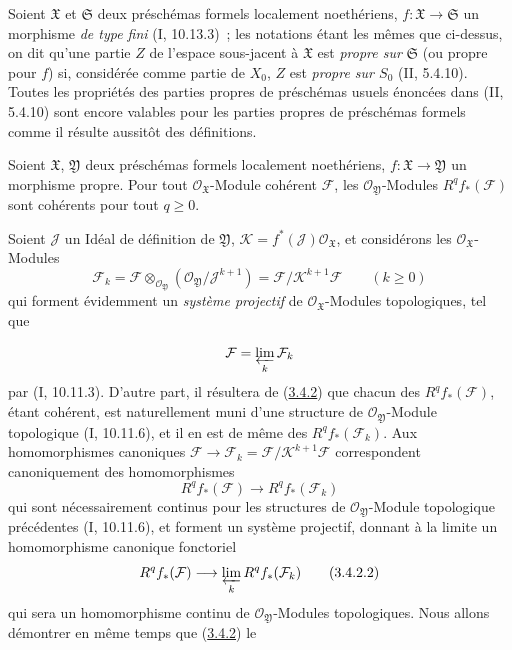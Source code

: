 \begin{env}[3.4.1]
Soient $\mathfrak X$ et $\mathfrak S$ deux préschémas formels localement
noethériens, $f:\mathfrak X\to\mathfrak S$ un morphisme \emph{de type fini}
(I, 10.13.3)~; les notations étant les mêmes que ci-dessus, on dit qu'une
partie $Z$ de l'espace sous-jacent à $\mathfrak X$ est \emph{propre sur}
$\mathfrak S$ (ou propre pour $f$) si, considérée comme partie de $X_0$, $Z$
est \emph{propre sur $S_0$} (II, 5.4.10). Toutes les propriétés des parties
propres de préschémas usuels énoncées dans (II, 5.4.10) sont encore valables
pour les parties propres de préschémas formels comme il résulte aussitôt des
définitions.
\end{env}

\begin{theorem}[3.4.2]
\label{III.3.4.2-fr}
Soient $\mathfrak X$, $\mathfrak Y$ deux préschémas formels localement
noethériens, $f:\mathfrak X\to\mathfrak Y$ un morphisme propre. Pour tout
$\mathcal O_{\mathfrak X}$-Module cohérent $\mathcal F$, les
$\mathcal O_{\mathfrak Y}$-Modules $R^qf_*(\mathcal F)$ sont cohérents pour
tout $q\geq0$.
\end{theorem}

Soient $\mathcal J$ un Idéal de définition de $\mathfrak Y$,
$\mathcal K=f^*(\mathcal J)\mathcal O_{\mathfrak X}$, et considérons les
$\mathcal O_{\mathfrak X}$-Modules
\[
\mathcal F_k=\mathcal F\otimes_{\mathcal O_{\mathfrak Y}}
(\mathcal O_{\mathfrak Y}/\mathcal J^{k+1})
=\mathcal F/\mathcal K^{k+1}\mathcal F\qquad(k\geq0)
\tag{3.4.2.1}\label{III.3.4.2.1-fr}
\]
qui forment évidemment un \emph{système projectif} de
$\mathcal O_{\mathfrak X}$-Modules topologiques, tel que

\[
\mathcal F=\varprojlim_k\mathcal F_k
\]
par (I, 10.11.3). D'autre part, il résultera de
(\hyperref[III.3.4.2-fr]{3.4.2}) que chacun des $R^qf_*(\mathcal F)$, étant
cohérent, est naturellement muni d'une structure de
$\mathcal O_{\mathfrak Y}$-Module topologique (I, 10.11.6), et il en est de
même des $R^qf_*(\mathcal F_k)$. Aux homomorphismes canoniques
$\mathcal F\to\mathcal F_k=\mathcal F/\mathcal K^{k+1}\mathcal F$
correspondent canoniquement des homomorphismes
\[
R^qf_*(\mathcal F)\longrightarrow R^qf_*(\mathcal F_k)
\]
qui sont nécessairement continus pour les structures de
$\mathcal O_{\mathfrak Y}$-Module topologique précédentes (I, 10.11.6), et
forment un système projectif, donnant à la limite un homomorphisme canonique
fonctoriel
\[
R^qf_*(\mathcal F)\longrightarrow\varprojlim_kR^qf_*(\mathcal F_k)
\tag{3.4.2.2}\label{III.3.4.2.2-fr}
\]
qui sera un homomorphisme continu de $\mathcal O_{\mathfrak Y}$-Modules
topologiques. Nous allons démontrer en même temps que
(\hyperref[III.3.4.2-fr]{3.4.2}) le

